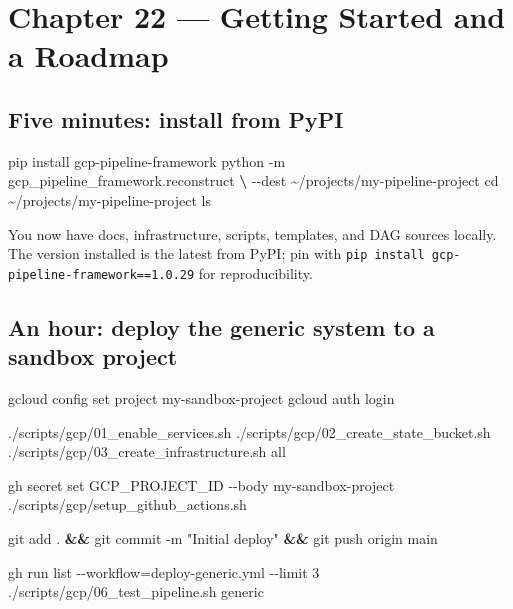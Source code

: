 \documentclass[
  11pt,
  british,
  oneside]{book}
\newenvironment{Shaded}{\begin{snugshade}}{\end{snugshade}}
\newcommand{\BuiltInTok}[1]{#1}
\newcommand{\ExtensionTok}[1]{#1}
\newcommand{\FunctionTok}[1]{\textcolor[rgb]{0.00,0.00,0.00}{#1}}
\newcommand{\KeywordTok}[1]{\textcolor[rgb]{0.13,0.29,0.53}{\textbf{#1}}}
\newcommand{\NormalTok}[1]{#1}
\newcommand{\StringTok}[1]{\textcolor[rgb]{0.31,0.60,0.02}{#1}}
\begin{document}
\hypertarget{chapter-22-getting-started-and-a-roadmap}{%
\chapter{Chapter 22 --- Getting Started and a
Roadmap}\label{chapter-22-getting-started-and-a-roadmap}}

\hypertarget{five-minutes-install-from-pypi}{%
\section{Five minutes: install from
PyPI}\label{five-minutes-install-from-pypi}}

\begin{Shaded}
\begin{Highlighting}[]
\ExtensionTok{pip}\NormalTok{ install gcp{-}pipeline{-}framework}
\ExtensionTok{python}\NormalTok{ {-}m gcp\_pipeline\_framework.reconstruct }\KeywordTok{\textbackslash{}}
    \ExtensionTok{{-}{-}dest}\NormalTok{ \textasciitilde{}/projects/my{-}pipeline{-}project}
\BuiltInTok{cd}\NormalTok{ \textasciitilde{}/projects/my{-}pipeline{-}project}
\FunctionTok{ls}
\end{Highlighting}
\end{Shaded}

You now have docs, infrastructure, scripts, templates, and DAG sources
locally. The version installed is the latest from PyPI; pin with
\texttt{pip\ install\ gcp-pipeline-framework==1.0.29} for
reproducibility.

\hypertarget{an-hour-deploy-the-generic-system-to-a-sandbox-project}{%
\section{An hour: deploy the generic system to a sandbox
project}\label{an-hour-deploy-the-generic-system-to-a-sandbox-project}}

\begin{Shaded}
\begin{Highlighting}[]
\ExtensionTok{gcloud}\NormalTok{ config set project my{-}sandbox{-}project}
\ExtensionTok{gcloud}\NormalTok{ auth login}

\ExtensionTok{./scripts/gcp/01\_enable\_services.sh}
\ExtensionTok{./scripts/gcp/02\_create\_state\_bucket.sh}
\ExtensionTok{./scripts/gcp/03\_create\_infrastructure.sh}\NormalTok{ all}

\ExtensionTok{gh}\NormalTok{ secret set GCP\_PROJECT\_ID {-}{-}body }\StringTok{\textquotesingle{}my{-}sandbox{-}project\textquotesingle{}}
\ExtensionTok{./scripts/gcp/setup\_github\_actions.sh}

\FunctionTok{git}\NormalTok{ add . }\KeywordTok{\&\&} \FunctionTok{git}\NormalTok{ commit {-}m }\StringTok{"Initial deploy"} \KeywordTok{\&\&} \FunctionTok{git}\NormalTok{ push origin main}

\ExtensionTok{gh}\NormalTok{ run list {-}{-}workflow=deploy{-}generic.yml {-}{-}limit 3}
\ExtensionTok{./scripts/gcp/06\_test\_pipeline.sh}\NormalTok{ generic}
\end{Highlighting}
\end{Shaded}
\end{document}
